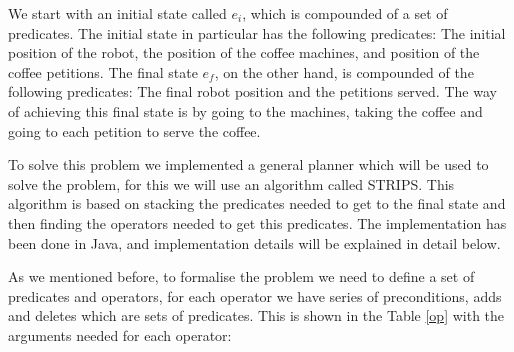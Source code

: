 \documentclass[12pt,a4paper,oneside]{article}
\numberwithin{equation}{section}
\numberwithin{equation}{section}
\theoremstyle{definition}
\begin{document}
We start with an initial state called $e_i$, which is compounded of a set of predicates. The initial state in particular has the following predicates: The initial position of the robot, the position of the coffee machines, and position of the coffee petitions.  The final state $e_f$, on the other hand, is compounded of the following predicates: The final robot position and the petitions served. The way of achieving this final state is by going to the machines, taking the coffee and going to each petition to serve the coffee.

To solve this problem we implemented a general planner which will be used to solve the problem, for this we will use an algorithm called STRIPS. This algorithm is based on stacking the predicates needed to get to the final state and then finding the operators needed to get this predicates. The implementation has been done in Java, and implementation details will be explained in detail below.

As we mentioned before, to formalise the problem we need to define a set of predicates and operators, for each operator we have series of preconditions, adds and deletes which are sets of predicates. This is shown in the Table \ref{op} with the arguments needed for each operator:
\end{document}
